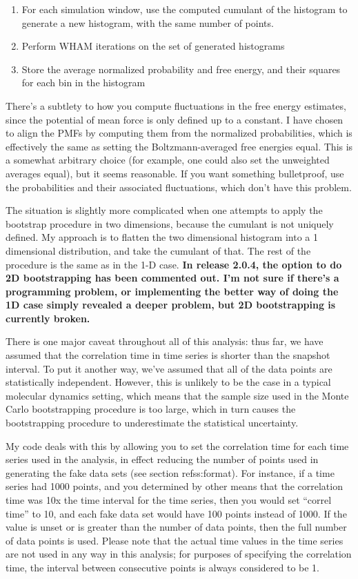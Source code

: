 \documentclass[12pt]{article}
\begin{document}
\begin{enumerate}

\item For each simulation window, use the computed cumulant of the histogram
to generate a new histogram, with the same number of points.

\item Perform WHAM iterations on the set of generated histograms

\item Store the average normalized probability and free energy, and their
squares for each bin in the histogram 
\end{enumerate}

There's a subtlety to how you compute fluctuations in the free energy
estimates, since the potential of mean force is only defined up to a
constant.  I have chosen to align the PMFs by computing them from the
normalized probabilities, which is effectively the same as setting the
Boltzmann-averaged free energies equal.  This is a somewhat arbitrary choice
(for example, one could also set the unweighted averages equal), but it seems
reasonable.  If you want something bulletproof, use the probabilities and
their associated fluctuations, which don't have this problem.

The situation is slightly more complicated when one attempts to apply the
bootstrap procedure in two dimensions, because the cumulant is not uniquely
defined.  My approach is to flatten the two dimensional histogram into a 1
dimensional distribution, and take the cumulant of that.  The rest of the
procedure is the same as in the 1-D case.  {\bf In release 2.0.4, the option
to do 2D bootstrapping has been commented out.  I'm not sure if there's a
programming problem, or implementing the better way of doing the 1D case
simply revealed a deeper problem, but 2D bootstrapping is currently broken.}

There is one major caveat throughout all of this analysis: thus far, we have
assumed that the correlation time in time series is shorter than the snapshot
interval.  To put it another way, we've assumed that all of the data points
are statistically independent.  However, this is unlikely to be the case in a
typical molecular dynamics setting, which means that the sample size used in
the Monte Carlo bootstrapping procedure is too large, which in turn causes
the bootstrapping procedure to underestimate the statistical uncertainty.  

My code deals with this by allowing you to set the correlation time for each
time series used in the analysis, in effect reducing the number of points
used in generating the fake data sets (see section ref{ss:format}).  For
instance, if a time series had 1000 points, and you determined by other means
that the correlation time was 10x the time interval for the time series, then
you would set ``correl time'' to 10, and each fake data set would have 100
points instead of 1000.  If the value is unset or is greater than the number
of data points, then the full number of data points is used.  Please note
that the actual time values in the time series are not used in any way in
this analysis; for purposes of specifying the correlation time, the interval
between consecutive points is always considered to be 1.
\end{document}
